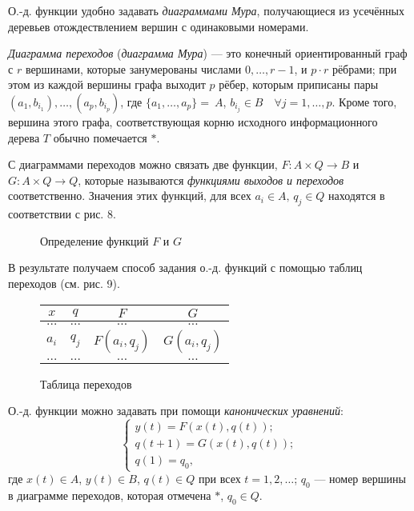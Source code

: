     О.-д. функции удобно задавать  \textit{диаграммами Мура}, получающиеся из усечённых деревьев отождествлением вершин с одинаковыми номерами.

\begin{definition}
    \textit{Диаграмма переходов} (\textit{диаграмма Мура}) --- это конечный ориентированный граф с $r$ вершинами, которые занумерованы числами $0, \ldots, r-1$, и $p\cdot r$ рёбрами; при этом из каждой вершины графа выходит $p$ рёбер, которым приписаны пары $(a_1, b_{i_1}), \ldots, (a_p, b_{i_p})$, где $\{a_1, \ldots, a_p\} =~A$, $b_{i_j} \in B \quad \forall j = 1, \ldots, p$. Кроме того, вершина этого графа, соответствующая корню исходного информационного дерева $T$ обычно помечается $*$.
\end{definition}

С диаграммами переходов можно связать две функции, $F:A\times Q \to B$ и $G:A\times Q \to Q$, которые называются \textit{функциями выходов и переходов} соответственно. Значения этих функций, для всех $a_i\in A,\, q_j \in Q$ находятся в соответствии с рис. 8.

\begin{figure}[h]
    \centering
    \caption{Определение функций $F$ и $G$}
\end{figure}

В результате получаем способ задания о.-д. функций с помощью таблиц переходов (см. рис. 9).

\begin{figure}[h]
    \centering
    \begin{tabular}{|c|c||c|c|}
        \hline
        $x$ & $q$ & $F$ & $G$ \\
        \hline
        $\ldots$ & $\ldots$ & $\ldots$ & $\ldots$\\
        $a_i$ & $q_j$ & $F(a_i, q_j)$ & $G(a_i, q_j)$\\
        $\ldots$ & $\ldots$ & $\ldots$ & $\ldots$\\
        \hline
    \end{tabular}
    \caption{Таблица переходов}
\end{figure}

О.-д. функции можно задавать при помощи \textit{канонических уравнений}:
\[
    \begin{cases}
        y(t) = F(x(t), q(t));\\
        q(t+1) = G(x(t), q(t));\\
        q(1) = q_0,
    \end{cases}
\]
где $x(t)\in A$, $y(t) \in B$, $q(t)\in Q$ при всех $t = 1, 2,\ldots$; $q_0$ --- номер вершины в диаграмме переходов, которая отмечена $*$, $q_0 \in Q$.

